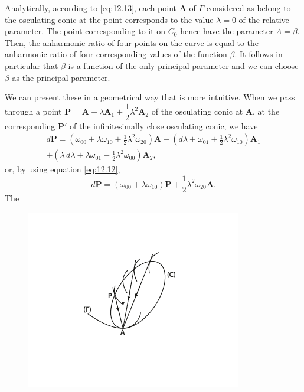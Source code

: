 \documentclass[leqno,11pt]{book}
\numberwithin{equation}{chapter}
\theoremstyle{shape1}
\theoremstyle{shapesmall}
\begin{document}
Analytically, according to \eqref{eq:12.13}, each point $\mathbf{A}$ of $\Gamma$ considered as belong to the osculating conic at the point corresponds to the value $\lambda=0$ of the relative parameter. The point corresponding to it on $C_{0}$ hence have the parameter $\Lambda=\beta$. Then, the anharmonic ratio of four points on the curve is equal to the anharmonic ratio of four corresponding values of the function $\beta$. It follows in particular that $\beta$ is a function of the only principal parameter and we can choose $\beta$ as the principal parameter.

We can present these in a geometrical way that is more intuitive. When we pass through a point $\mathbf{P}=\mathbf{A}+\lambda\mathbf{A}_{1}+\dfrac{1}{2}\lambda^{2}\mathbf{A}_{2}$ of the osculating conic at $\mathbf{A}$, at the corresponding $\mathbf{P}'$ of the infinitesimally close osculating conic, we have
\[
\begin{multlined}
  d\mathbf{P}=\left(\omega_{00}+\lambda\omega_{10}+\frac{1}{2}\lambda^{2}\omega_{20}\right)\mathbf{A}+\left(d\lambda+\omega_{01}+\frac{1}{2}\lambda^{2}\omega_{10}\right)\mathbf{A}_{1}\\
  +\left(\lambda\,d\lambda+\lambda\omega_{01}-\frac{1}{2}\lambda^{2}\omega_{00}\right)\mathbf{A}_{2},
\end{multlined}
\]
or, by using equation \eqref{eq:12.12},
\begin{equation}
  \label{eq:12.14}
  d\mathbf{P}=(\omega_{00}+\lambda\omega_{10})\mathbf{P}+\frac{1}{2}\lambda^{2}\omega_{20}\mathbf{A}.
\end{equation}
The \begin{figure}[hb]
  \caption{}
  \centering
\includegraphics[scale=1.8]{cartangrp-f6}  
\label{fig:12.1}
\end{figure}
\end{document}
